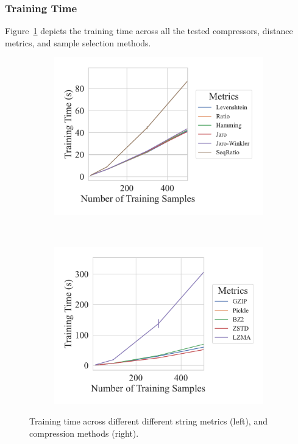 \subsubsection{Training Time}

Figure~\ref{fig:sms_spam_training_time} depicts the training time across all the tested compressors, distance metrics, and sample selection methods.

\begin{figure}[h!]
    \centering
    \captionsetup[subfigure]{skip=0pt}
	\begin{subfigure}[t]{.44\textwidth}
		\centering
		\includegraphics[width=\textwidth]{figs/sms_spam/string_metric_vs_train_time.pdf}
	\end{subfigure}
	~
	\begin{subfigure}[t]{.44\textwidth}
		\centering
		\includegraphics[width=\textwidth]{figs/sms_spam/compressor_metric_vs_train_time.pdf}
	\end{subfigure}
	\caption{Training time across different different string  metrics (left), and compression methods (right).}
	\label{fig:sms_spam_training_time}
\end{figure}

